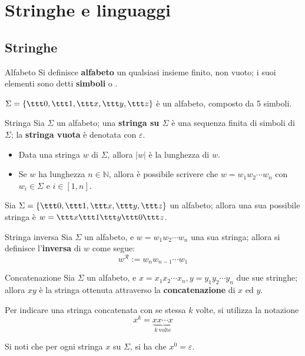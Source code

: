 \documentclass[a4paper, 12pt]{report}
\begin{document}
    \section{Stringhe e linguaggi}

    \subsection{Stringhe}

    \begin{frameddefn}{Alfabeto}
        Si definisce \textbf{alfabeto} un qualsiasi insieme finito, non vuoto; i suoi elementi sono detti \textbf{simboli} o .
    \end{frameddefn}

    \begin{example}[Alfabeto]
        $\Sigma = \{\ttt 0,\ttt 1,\ttt x,\ttt y,\ttt z\}$ è un alfabeto, composto da 5 simboli.
    \end{example}

    \begin{frameddefn}{Stringa}
        Sia $\Sigma$ un alfabeto; una \textbf{stringa su $\Sigma$} è una sequenza finita di simboli di $\Sigma$; la \textbf{stringa vuota} è denotata con $\varepsilon$.

        \begin{itemize}
            \item Data una stringa $w$ di $\Sigma$, allora $|w|$ è la lunghezza di $w$.
            \item Se $w$ ha lunghezza $n \in \mathbb{N}$, allora è possibile scrivere che $w = w_1 w_2 \cdots w_n$ con $w_i \in \Sigma$ e $i \in [1, n]$.
        \end{itemize}
    \end{frameddefn}

    \begin{example}[Stringa]
        Sia $\Sigma = \{\ttt 0,\ttt 1,\ttt x,\ttt y,\ttt z\}$ un alfabeto; allora una sua possibile stringa è $w = \ttt x \ttt 1 \ttt y \ttt 0 \ttt z$.
    \end{example}

    \begin{frameddefn}{Stringa inversa}
        Sia $\Sigma$ un alfabeto, e $w = w_1 w_2\cdots w_n$ una sua stringa; allora si definisce l'\textbf{inversa} di $w$ come segue: $$w^\mathcal{R} := w_n w_{n - 1}\cdots w_1$$
    \end{frameddefn}

    \begin{frameddefn}{Concatenazione}
        Sia $\Sigma$ un alfabeto, e $x = x_1 x_2 \cdots x_n, y = y_1 y_2 \cdots y_n$ due sue stringhe; allora $xy$ è la stringa ottenuta attraverso la \textbf{concatenazione} di $x$ ed $y$.

        Per indicare una stringa concatenata con se stessa $k$ volte, si utilizza la notazione $$x^k = \underbrace{xx \cdots x}_{k \ \textrm{volte}}$$

        Si noti che per ogni stringa $x$ su $\Sigma$, si ha che $x^0 = \varepsilon$.
    \end{frameddefn}
\end{document}
